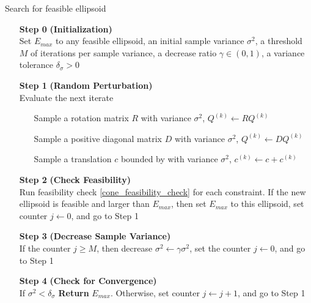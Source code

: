 \documentclass{article}
\theoremstyle{case}
\numberwithin{theorem}{subsection}
\newcommand{\ck}{{c^{(k)}}}
\newcommand{\qk}{{Q^{(k)}}}
\begin{document}
\begin{algorithm}[H]
    \caption{Search for feasible ellipsoid}
    \label{numerical_ellipsoid_algorithm}
    \begin{itemize}
        \item[\textbf{Step 0}] \textbf{(Initialization)} \\
                Set $E_{max}$ to any feasible ellipsoid, 
                an initial sample variance $\sigma^2$, 
                a threshold $M$ of iterations per sample variance, 
                a decrease ratio $\gamma \in (0, 1)$, 
                a variance tolerance $\delta_{\sigma} > 0$
        
        \item[\textbf{Step 1}] \textbf{(Random Perturbation)} \\
            Evaluate the next iterate \begin{itemize}
                \item[] Sample a rotation matrix $R$ with variance $\sigma^2$, $\qk \gets R \qk$
                \item[] Sample a positive diagonal matrix $D$ with variance $\sigma^2$, $\qk \gets D \qk$
                \item[] Sample a translation $c$ bounded by with variance $\sigma^2$, $\ck \gets c + \ck$
            \end{itemize}
        
        \item[\textbf{Step 2}] \textbf{(Check Feasibility)} \\
            Run feasibility check \cref{cone_feasibility_check} for each constraint.
            If the new ellipsoid is feasible and larger than $E_{max}$, then 
            	set $E_{max}$ to this ellipsoid,
            	set counter $j \gets 0$, and
            	go to Step 1
        
        \item[\textbf{Step 3}] \textbf{(Decrease Sample Variance)} \\
            If the counter $j \ge M$, then
	    	decrease $\sigma^2 \gets \gamma \sigma^2$,
	    	set the counter $j\gets 0$, and
	    	go to Step 1
            
        \item[\textbf{Step 4}] \textbf{(Check for Convergence)} \\
	    If $\sigma^2 < \delta_{\sigma}$ \textbf{Return} $E_{max}$.
	    Otherwise, 
        		set counter $j \gets j + 1$, and
        		go to Step 1
    \end{itemize}
\end{algorithm}
\end{document}
